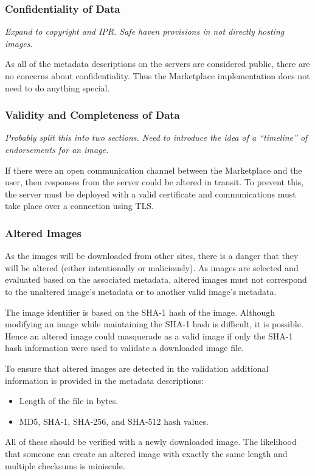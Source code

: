 \subsubsection{Confidentiality of Data}

{\em Expand to copyright and IPR.  Safe haven provisions in not
  directly hosting images.}

As all of the metadata descriptions on the servers are considered
public, there are no concerns about confidentiality.  Thus the
Marketplace implementation does not need to do anything special.

\subsubsection{Validity and Completeness of Data}

{\em Probably split this into two sections.  Need to introduce the
  idea of a ``timeline'' of endorsements for an image.}

If there were an open communication channel between the Marketplace
and the user, then responses from the server could be altered in
transit.  To prevent this, the server must be deployed with a valid
certificate and communications must take place over a connection using
TLS\@.

\subsubsection{Altered Images}

As the images will be downloaded from other sites, there is a danger
that they will be altered (either intentionally or maliciously).  As
images are selected and evaluated based on the associated metadata,
altered images must not correspond to the unaltered image's metadata
or to another valid image's metadata.

The image identifier is based on the SHA-1 hash of the image.
Although modifying an image while maintaining the SHA-1 hash
is difficult, it is possible.  Hence an altered image could masquerade
as a valid image if only the SHA-1 hash information were used to
validate a downloaded image file.

To ensure that altered images are detected in the validation
additional information is provided in the metadata descriptions:
\begin{itemize}
\item Length of the file in bytes.
\item MD5, SHA-1, SHA-256, and SHA-512 hash values.
\end{itemize}
All of these should be verified with a newly downloaded image.  The
likelihood that someone can create an altered image with exactly the
same length and multiple checksums is miniscule.

